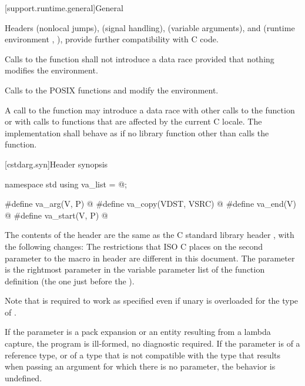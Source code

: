 [support.runtime.general]{General}

\pnum
{}%
%
Headers
 (nonlocal jumps),
 (signal handling),
 (variable arguments),
and
 (runtime environment , ),
provide further compatibility with C code.

\pnum
Calls to the function
%
 shall not introduce a data
race provided that nothing modifies the environment.
\begin{note}
Calls to the POSIX functions
%
 and
%
 modify the
environment.
\end{note}

\pnum
A call to the  function
may introduce a data race with other
calls to the  function or with calls to functions that are
affected by the current C locale. The implementation shall behave as if no
library function other than  calls the 
function.

[cstdarg.syn]{Header  synopsis}

%
%
%
%
%
%
\begin{codeblock}
namespace std {
  using va_list = @\seebelow@;
}

#define va_arg(V, P) @\seebelow@
#define va_copy(VDST, VSRC) @\seebelow@
#define va_end(V) @\seebelow@
#define va_start(V, P) @\seebelow@
\end{codeblock}

\pnum
The contents of the header  are the same as the C
standard library header , with the following changes:
The restrictions that ISO C places on the second parameter to the
%
 macro in header 
are different in this document.
The parameter
is the rightmost parameter in the variable parameter list
of the function definition (the one just before the
).
\begin{footnote}
Note that
is required to work as specified even if unary
is overloaded for the type of
.
\end{footnote}
If the parameter  is a pack expansion or
an entity resulting from a lambda capture,
the program is ill-formed, no diagnostic required.
If the parameter
is of a reference type, or of a type that is not compatible with the
type that results when passing an argument for which there is no
parameter, the behavior is undefined.

